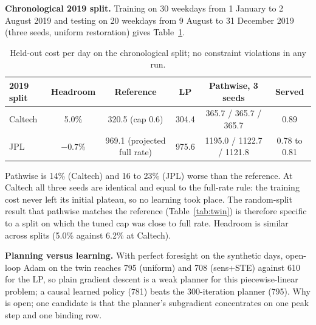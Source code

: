 \documentclass[11pt]{article}
\begin{document}
\textbf{Chronological 2019 split.} Training on 30 weekdays from 1 January to 2 August 2019 and testing on 20 weekdays from 9 August to 31 December 2019 (three seeds, uniform restoration) gives Table~\ref{tab:chrono}.
\begin{table}[h]\centering\small
\begin{tabular}{@{}lccccc@{}}\toprule 2019 split & Headroom & Reference & LP & Pathwise, 3 seeds & Served\\\midrule
Caltech & 5.0\% & 320.5 (cap 0.6) & 304.4 & 365.7 / 365.7 / 365.7 & 0.89\\
JPL & $-0.7$\% & 969.1 (projected full rate) & 975.6 & 1195.0 / 1122.7 / 1121.8 & 0.78 to 0.81\\\bottomrule
\end{tabular}\caption{Held-out cost per day on the chronological split; no constraint violations in any run.}\label{tab:chrono}\end{table}
Pathwise is 14\% (Caltech) and 16 to 23\% (JPL) worse than the reference. At Caltech all three seeds are identical and equal to the full-rate rule: the training cost never left its initial plateau, so no learning took place. The random-split result that pathwise matches the reference (Table~\ref{tab:twin}) is therefore specific to a split on which the tuned cap was close to full rate. Headroom is similar across splits (5.0\% against 6.2\% at Caltech).

\textbf{Planning versus learning.} With perfect foresight on the synthetic days, open-loop Adam on the twin reaches 795 (uniform) and 708 (sens+STE) against 610 for the LP, so plain gradient descent is a weak planner for this piecewise-linear problem; a causal learned policy (781) beats the 300-iteration planner (795). Why is open; one candidate is that the planner's subgradient concentrates on one peak step and one binding row.
\end{document}
